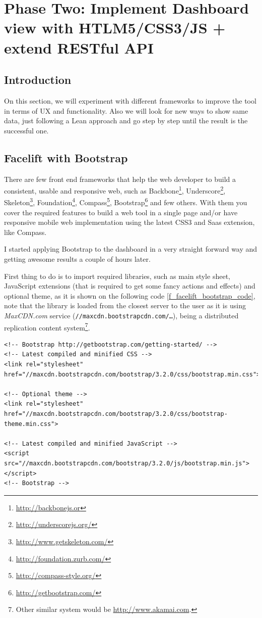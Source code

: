 \part{Phase Two: Implement Dashboard view with HTLM5/CSS3/JS + extend RESTful
API}

\chapter*{Introduction}
\label{c_phasetwo}
On this section, we will experiment with different frameworks to improve the
tool in terms of UX and functionality. Also we will look for new ways to show
same data, just following a Lean approach and go step by step until the result
is the successful one.


\chapter{Facelift with Bootstrap}
There are few front end frameworks that help the web developer to build a
consistent, usable and responsive web, such as
Backbone\footnote{\url{http://backbonejs.or}}, 
Underscore\footnote{\url{http://underscorejs.org/}},
Skeleton\footnote{\url{http://www.getskeleton.com/}},
Foundation\footnote{\url{http://foundation.zurb.com/}},
Compass\footnote{\url{http://compass-style.org/}},
Bootstrap\footnote{\url{http://getbootstrap.com/}} and few others. With them
you cover the required features to build a web tool in a
single page and/or have responsive mobile web implementation using the latest
CSS3 and Saas extension, like Compass.

I started applying Bootstrap to the dashboard in a very straight forward way and
getting awesome results a couple of hours later.

First thing to do is to import required libraries, such as main style sheet,
JavaScript extensions (that is required to get some fancy actions and effects)
and optional theme, as it is shown on the following code
\ref{f_facelift_bootstrap_code}, note that the library is loaded from the
closest server to the user as it is using \emph{MaxCDN.com} service
(\texttt{//maxcdn.bootstrapcdn.com/\ldots}), being a distributed replication
content system\footnote{Other similar system would be
\url{http://www.akamai.com}.}.

\begin{lstlisting}[style=html,breaklines=true,caption=Bootstrap\
required\ libraries,label=f_facelift_bootstrap_code]
<!-- Bootstrap http://getbootstrap.com/getting-started/ --> 
<!-- Latest compiled and minified CSS --> 
<link rel="stylesheet" href="//maxcdn.bootstrapcdn.com/bootstrap/3.2.0/css/bootstrap.min.css">

<!-- Optional theme -->
<link rel="stylesheet" href="//maxcdn.bootstrapcdn.com/bootstrap/3.2.0/css/bootstrap-theme.min.css">

<!-- Latest compiled and minified JavaScript -->
<script src="//maxcdn.bootstrapcdn.com/bootstrap/3.2.0/js/bootstrap.min.js"></script>
<!-- Bootstrap -->
\end{lstlisting} 

